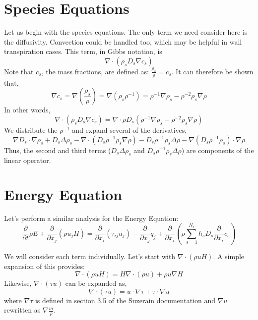 \documentclass[10pt]{article}
\newcommand{\myred}[1]{{\color{red} #1}}
\begin{document}
\section{Species Equations}
Let us begin with the species equations. The only term we need consider here is
the diffusivity.  \myred{Convection could be handled too, which may be helpful
in wall transpiration cases.} This term, in Gibbs notation, is
\begin{equation}
  \nabla \cdot (\rho_s D_s \nabla c_s)
\end{equation}
Note that $c_s$, the mass fractions, are defined as: $\frac{\rho_s}{\rho} =
c_s$.  It can therefore be shown that,
\begin{equation}
  \nabla c_s = \nabla (\frac{\rho_s}{\rho}) = \nabla (\rho_s \rho^{-1})
             = \rho^{-1} \nabla \rho_s - \rho^{-2} \rho_s \nabla \rho
\end{equation}
In other words,
\begin{equation}
  \label{eq:speciesdiffexpansion}
  \nabla \cdot (\rho_s D_s \nabla c_s) = \nabla \cdot \rho D_s (\rho^{-1} \nabla \rho_s - \rho^{-2} \rho_s \nabla \rho)
\end{equation}
We distribute the $\rho^{-1}$ and expand several of the derivatives,
\begin{equation}
  \nabla D_s \cdot \nabla \rho_s + D_s \Delta \rho_s - \nabla \cdot (D_s \rho^{-1} \rho_s \nabla \rho) - D_s \rho^{-1} \rho_s \Delta \rho - \nabla(D_s \rho^{-1} \rho_s) \cdot \nabla \rho
\end{equation}
Thus, the second and third terms ($D_s \Delta \rho_s$ and $D_s \rho^{-1} \rho_s \Delta \rho$) are components of the linear operator.

\section{Energy Equation}

Let's perform a similar analysis for the Energy Equation:
\begin{equation}
\frac{\partial}{\partial t} \rho E + \frac{\partial }{\partial x_j}\left(\rho
u_j H\right) = \frac{\partial }{\partial x_i}\left(\tau_{ij}u_j\right) -
\frac{\partial }{\partial x_j}q_j + \frac{\partial }{\partial x_i}\left(\rho
\sum^{N_s}_{s=1} h_s D_s \frac{\partial}{\partial x_i} c_s\right)
\end{equation}

We will consider each term individually. Let's start with $\nabla \cdot (\rho u H)$. A simple expansion of this provides:
\begin{equation}
  \nabla \cdot (\rho u H) = H \nabla \cdot (\rho u) + \rho u \nabla H
\end{equation}
Likewise, $\nabla \cdot (\tau u)$ can be expanded as,
\begin{equation}
 \nabla \cdot (\tau u) = u \cdot \nabla \tau + \tau \cdot \nabla u
\end{equation}
where $\nabla \tau$ is defined in section 3.5 of the Suzerain documentation and
$\nabla u$ rewritten as $\nabla \frac{m}{\rho}$.
\end{document}
